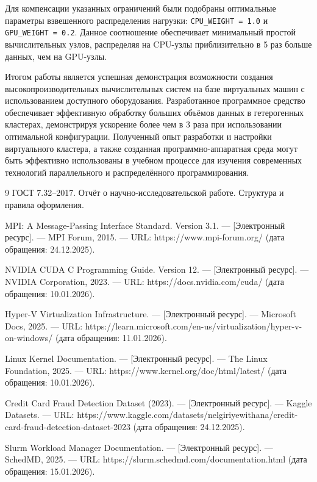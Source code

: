 \documentclass[areaset=advanced]{scrartcl}
\begin{document}
Для компенсации указанных ограничений были подобраны оптимальные параметры взвешенного распределения нагрузки: \texttt{CPU\_WEIGHT = 1.0} и \texttt{GPU\_WEIGHT = 0.2}. Данное соотношение обеспечивает минимальный простой вычислительных узлов, распределяя на CPU-узлы приблизительно в 5 раз больше данных, чем на GPU-узлы.

Итогом работы является успешная демонстрация возможности создания высокопроизводительных вычислительных систем на базе виртуальных машин с использованием доступного оборудования. Разработанное программное средство обеспечивает эффективную обработку больших объёмов данных в гетерогенных кластерах, демонстрируя ускорение более чем в 3 раза при использовании оптимальной конфигурации. Полученный опыт разработки и настройки виртуального кластера, а также созданная программно-аппаратная среда могут быть эффективно использованы в учебном процессе для изучения современных технологий параллельного и распределённого программирования.

\newpage
\begin{thebibliography}{9}
ГОСТ 7.32–2017. Отчёт о научно-исследовательской работе. Структура и правила оформления.

MPI: A Message-Passing Interface Standard. Version 3.1. — [Электронный ресурс]. — MPI Forum, 2015. — URL: https://www.mpi-forum.org/ (дата обращения: 24.12.2025).

NVIDIA CUDA C Programming Guide. Version 12. — [Электронный ресурс]. — NVIDIA Corporation, 2023. — URL: https://docs.nvidia.com/cuda/ (дата обращения: 10.01.2026).

Hyper-V Virtualization Infrastructure. — [Электронный ресурс]. — Microsoft Docs, 2025. — URL: https://learn.microsoft.com/en-us/virtualization/hyper-v-on-windows/ (дата обращения: 11.01.2026).

Linux Kernel Documentation. — [Электронный ресурс]. — The Linux Foundation, 2025. — URL: https://www.kernel.org/doc/html/latest/ (дата обращения: 10.01.2026).

Credit Card Fraud Detection Dataset (2023). — [Электронный ресурс]. — Kaggle Datasets. — URL: https://www.kaggle.com/datasets/nelgiriyewithana/credit-card-fraud-detection-dataset-2023 (дата обращения: 24.12.2025).

Slurm Workload Manager Documentation. — [Электронный ресурс]. — SchedMD, 2025. — URL: https://slurm.schedmd.com/documentation.html (дата обращения: 15.01.2026).
\end{thebibliography}
\end{document}
